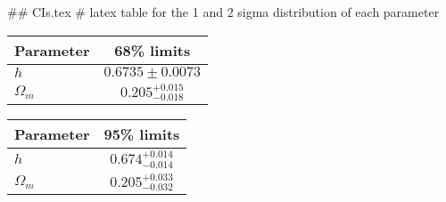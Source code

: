 ## CIs.tex
# latex table for the 1 and 2 sigma distribution of each parameter

\begin{tabular} { l  c}
 Parameter &  68\% limits\\
\hline
{\boldmath$h              $} & $0.6735\pm 0.0073          $\\
{\boldmath$\Omega_m       $} & $0.205^{+0.015}_{-0.018}   $\\
\hline
\end{tabular}

\begin{tabular} { l  c}
 Parameter &  95\% limits\\
\hline
{\boldmath$h              $} & $0.674^{+0.014}_{-0.014}   $\\
{\boldmath$\Omega_m       $} & $0.205^{+0.033}_{-0.032}   $\\
\hline
\end{tabular}
